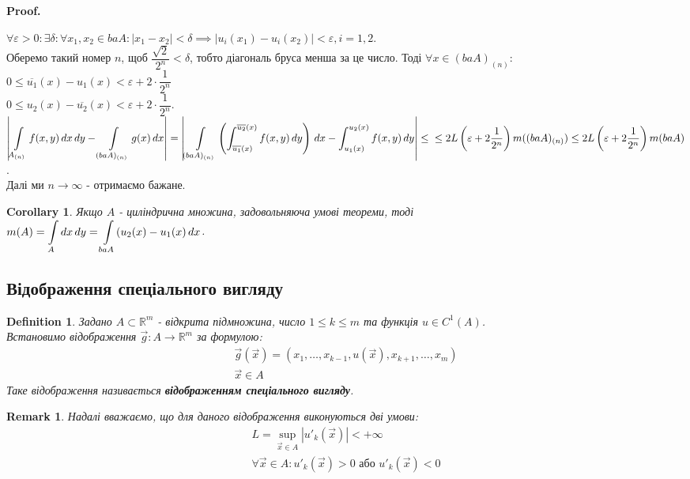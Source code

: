 \documentclass[a4paper, 10pt]{article}
\makeatletter
\def\qed{$\blacksquare$}
\theoremstyle{theoremdd}
\theoremstyle{theoremdd}
\newtheorem{definition}[theorem]{Definition}
\theoremstyle{theoremdd}
\theoremstyle{theoremdd}
\theoremstyle{theoremdd}
\theoremstyle{theoremdd}
\newtheorem{remark}[theorem]{Remark}
\theoremstyle{theoremdd}
\theoremstyle{theoremdd}
\newtheorem{corollary}[theorem]{Corollary}
\renewenvironment{proof}[1][Proof.\\]{\par
\pushQED{\hfill \qed}%
\normalfont \topsep6\p@\@plus6\p@\relax
\trivlist
\item\relax
{\bfseries
#1\@addpunct{.}}\hspace\labelsep\ignorespaces
}{%
\popQED\endtrivlist\@endpefalse
}
\makeatother
\begin{document}
\begin{proof}
$\forall \varepsilon > 0: \exists \delta: \forall x_1,x_2 \in baA: |x_1-x_2| < \delta \implies |u_i(x_1)-u_i(x_2)| < \varepsilon, i =1,2$.\\
Оберемо такий номер $n$, щоб $\dfrac{\sqrt{2}}{2^n} < \delta$, тобто діагональ бруса менша за це число. Тоді $\forall x \in (baA)_{(n)}:$\\
$0 \leq \overline{u_1}(x) - u_1(x) < \varepsilon + 2 \cdot \dfrac{1}{2^n}$\\
$0 \leq u_2(x) - \overline{u_2}(x) < \varepsilon + 2 \cdot \dfrac{1}{2^n}$.\\
$\displaystyle\abs{\int\displaylimits_{A_{(n)}} f(x,y)\,dx\,dy - \int\displaylimits_{(baA)_{(n)}} g(x)\,dx} = \abs{\int\displaylimits_{(baA)_{(n)}} \left(\int_{\overline{u_1}(x)}^{\overline{u_2}(x)} f(x,y)\,dy \right)\,dx - \int_{u_1(x)}^{u_2(x)} f(x,y)\,dy} \leq \\
\leq 2L\left(\varepsilon + 2 \dfrac{1}{2^n}\right) m((baA)_{(n)}) \leq 2L\left(\varepsilon + 2 \dfrac{1}{2^n}\right) m(baA)$.\\
Далі ми $n \to \infty$ - отримаємо бажане.
\end{proof}

\begin{corollary}
Якщо $A$ - циліндрична множина, задовольняюча умові теореми, тоді\\
$m(A) = \displaystyle\int\displaylimits_A dx\,dy = \int\displaylimits_{baA} (u_2(x)-u_1(x)\,dx$.
\end{corollary}

\subsection{Відображення спеціального вигляду}
\begin{definition}
Задано $A \subset \mathbb{R}^m$ - відкрита підмножина, число $1 \leq k \leq m$ та функція $u \in C^{1}(A)$.\\
Встановимо відображення $\vec{g}: A \to \mathbb{R}^m$ за формулою:
\begin{align*}
\vec{g}(\vec{x}) = (x_1,\dots,x_{k-1},u(\vec{x}),x_{k+1},\dots,x_m) \\ \vec{x} \in A
\end{align*}
Таке відображення називається \textbf{відображенням спеціального вигляду}.
\end{definition}

\begin{remark}
Надалі вважаємо, що для даного відображення виконуються дві умови:
\begin{align*}
L = \sup_{\vec{x} \in A} |u'_k(\vec{x})| < +\infty \\
\forall \vec{x} \in A: u'_k(\vec{x}) > 0 \text{ або } u'_k(\vec{x}) < 0
\end{align*}
\end{remark}
\end{document}

